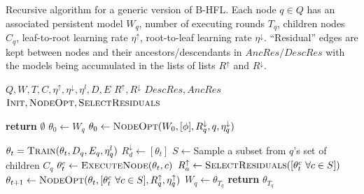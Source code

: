 \begin{algorithm}[H]
    \caption[Bidirectional Hierarchical FL]{Recursive algorithm for a generic version of B-HFL. Each node $q \in Q$ has an associated persistent model $W_q$, number of executing rounds $T_q$, children nodes $C_q$, leaf-to-root learning rate $\eta^\uparrow$, root-to-leaf learning rate $\eta^\downarrow$. ``Residual'' edges are kept between nodes and their ancestors/descendants in $AncRes/DescRes$
        with the models being accumulated in the lists of lists $R^\uparrow$ and $R^\downarrow$. }\label{alg:B-HFL}
    \begin{onehalfspace}

        \begin{algorithmic}[1]
            \Require \(Q, W, T, C, \eta^\uparrow, \eta^\downarrow, \eta^l,D,E\)
            \Require $R^{\uparrow},R^{\downarrow}$ 
            \Require $DescRes,AncRes $ 
            \Require \( \textsc{Init}, \textsc{NodeOpt}, \textsc{SelectResiduals}  \)

            \textbf{return} $\emptyset$ 
            \EndIf
            \State $\theta_0 \gets W_q$  
            \If{$\phi \neq \emptyset$}
            \State $\theta_0 \gets \Call{NodeOpt}{W_0,[\phi], R^\downarrow_q, q, \eta^\downarrow_q} $ 
            \EndIf



            \State $\theta_t = \Call{Train}{\theta_{t},D_q,  E_q, \eta^l_q}$ 
            \State $ R^\downarrow_d \gets [\theta_t]$
            \EndFor
            \State $S \gets $Sample a subset from $q$'s set of children $C_q$
            \State $\theta_t^c \gets \Call{ExecuteNode}{\theta_t, c} $ 
            \EndFor
            \State $ R^\uparrow_a \gets \Call{SelectResiduals}{[\theta^c_t \,\, \forall c \in S]}$
            \EndFor
            \State $\theta_{t+1} \gets \Call{NodeOpt}{\theta_t, [\theta^c_t \,\, \forall c \in S], R^\uparrow_q, \eta^{\uparrow}_q}  $ 
            \EndFor
            \State $W_q \gets \theta_{T_q}$ 
            \State \textbf{return} $\theta_{T_q}$
            \EndProcedure


\end{algorithmic}
\end{onehalfspace}
\end{algorithm}
